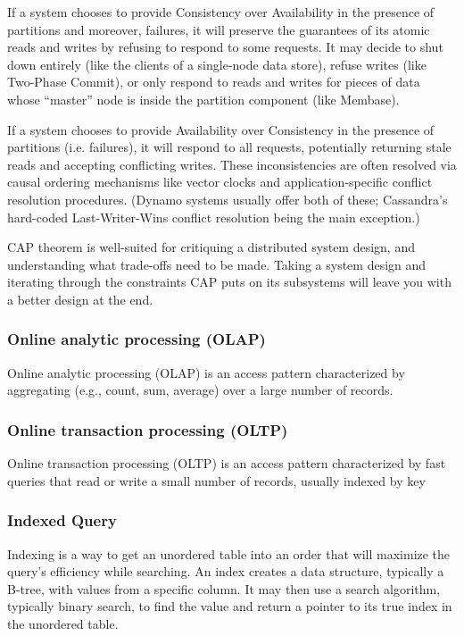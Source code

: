 \documentclass{article}
\begin{document}
    If a system chooses to provide Consistency over Availability in the presence of partitions and moreover, failures, it will preserve the guarantees of its atomic reads and writes by refusing to respond to some requests. It may decide to shut down entirely (like the clients of a single-node data store), refuse writes (like Two-Phase Commit), or only respond to reads and writes for pieces of data whose ``master” node is inside the partition component (like Membase).
    
    If a system chooses to provide Availability over Consistency in the presence of partitions (i.e. failures), it will respond to all requests, potentially returning stale reads and accepting conflicting writes. These inconsistencies are often resolved via causal ordering mechanisms like vector clocks and application-specific conflict resolution procedures. (Dynamo systems usually offer both of these; Cassandra’s hard-coded Last-Writer-Wins conflict resolution being the main exception.)
    
    CAP theorem is well-suited for critiquing a distributed system design, and understanding what trade-offs need to be made. Taking a system design and iterating through the constraints CAP puts on its subsystems will leave you with a better design at the end. 
    
    \subsubsection{Online analytic processing (OLAP)}
    Online analytic processing (OLAP) is an access pattern characterized by aggregating (e.g., count, sum, average) over a large number of records.

    \subsubsection{Online transaction processing (OLTP)}
    Online transaction processing (OLTP) is an access pattern characterized by fast queries that read or write a small number of records, usually indexed by key
    
    \subsubsection{Indexed Query}
    Indexing is a way to get an unordered table into an order that will maximize the query’s efficiency while searching. An index creates a data structure, typically a B-tree, with values from a specific column. It may then use a search algorithm, typically binary search, to find the value and return a pointer to its true index in the unordered table.
    
\end{document}
